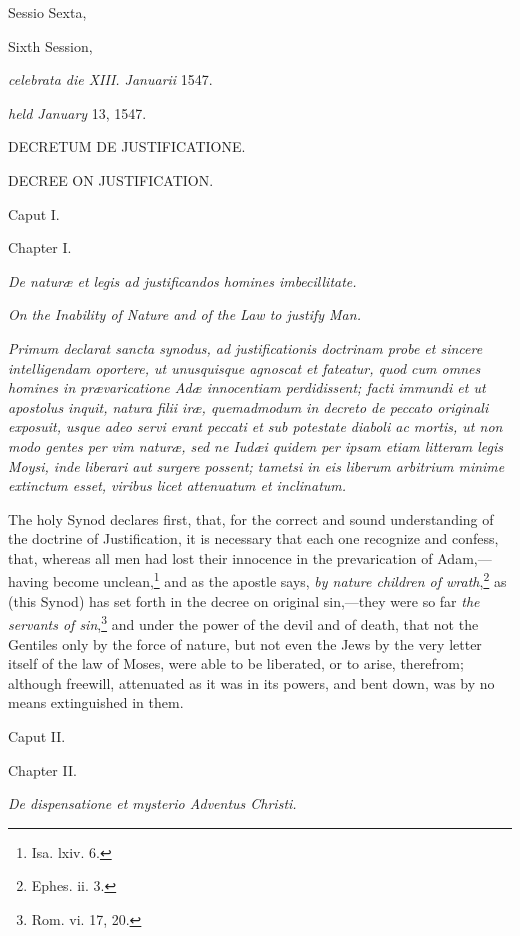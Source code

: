 
Sessio Sexta,

Sixth Session,

\emph{celebrata die XIII. Januarii} 1547.

\emph{held January} 13, 1547.

DECRETUM DE JUSTIFICATIONE.

DECREE ON JUSTIFICATION.

Caput I.

Chapter I.

\emph{De naturæ et legis ad justificandos homines imbecillitate.}

\emph{On the Inability of Nature and of the Law to justify Man.}

\emph{Primum declarat sancta synodus, ad justificationis doctrinam probe et sincere intelligendam oportere, ut unusquisque agnoscat et fateatur, quod cum omnes homines in prævaricatione Adæ innocentiam perdidissent; facti immundi et ut apostolus inquit, natura filii iræ, quemadmodum in decreto de peccato originali exposuit, usque adeo servi erant peccati et sub potestate diaboli ac mortis, ut non modo gentes per vim naturæ, sed ne Iudæi quidem per ipsam etiam litteram legis Moysi, inde liberari aut surgere possent; tametsi in eis liberum arbitrium minime extinctum esset, viribus licet attenuatum et inclinatum.}

The holy Synod declares first, that, for the correct and sound understanding of the doctrine of Justification, it is necessary that each one recognize and confess, that, whereas all men had lost their innocence in the prevarication of Adam,—having become unclean,\footnote{\par   Isa. lxiv. 6.} and as the apostle says, \emph{by nature children of wrath},\footnote{\par   Ephes. ii. 3.} as (this Synod) has set forth in the decree on original sin,—they were so far \emph{the servants of sin},\footnote{\par   Rom. vi. 17, 20.} and under the power of the devil and of death, that not the Gentiles only by the force of nature, but not even the Jews by the very letter itself of the law of Moses, were able to be liberated, or to arise, therefrom; although freewill, attenuated as it was in its powers, and bent down, was by no means extinguished in them.

Caput II.

Chapter II.

\emph{De dispensatione et mysterio Adventus Christi.}

